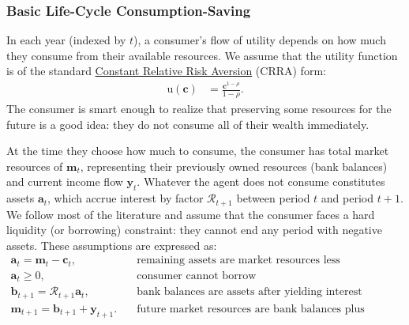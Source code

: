 \documentclass{article}
\newcommand{\CRRA}{\rho}
\newcommand{\uFunc}{\mathrm{u}}
\newcommand{\cLvl}{\mathbf{c}}
\newcommand{\mLvl}{\mathbf{m}}
\newcommand{\yLvl}{\mathbf{y}}
\newcommand{\aLvl}{\mathbf{a}}
\newcommand{\Rport}{\mathcal{R}}
\newcommand{\bLvl}{\mathbf{b}}
\begin{document}
\subsubsection{Basic Life-Cycle Consumption-Saving}\label{basic-cs}

In each year (indexed by $t$), a consumer's flow of utility depends on how much they consume from their available resources.
We assume that the utility function is of the standard \href{https://en.wikipedia.org/wiki/Isoelastic\_utility}{Constant Relative Risk Aversion} (CRRA) form:
\begin{align}
    \uFunc(\cLvl) & = \frac{\cLvl^{1-\CRRA}}{1-\CRRA}.
\end{align}
The consumer is smart enough to realize that preserving some resources for the future is a good idea: they do not consume all of their wealth immediately.

At the time they choose how much to consume, the consumer has total market resources of $\mLvl_t$, representing their previously owned resources (bank balances) and current income flow $\yLvl_t$.
Whatever the agent does not consume constitutes assets $\aLvl_t$, which accrue interest by factor $\Rport_{t+1}$ between period $t$ and period $t+1$.
We follow most of the literature and assume that the consumer faces a hard liquidity (or borrowing) constraint: they cannot end any period with negative assets.
These assumptions are expressed as:
\begin{align}
    \aLvl_t = \mLvl_t - \cLvl_t, & \text{~~~remaining assets are market resources less consumption} \\
    \aLvl_t \geq 0, & \text{~~~consumer cannot borrow} \\
    \bLvl_{t+1} = \Rport_{t+1} \aLvl_t, & \text{~~~bank balances are assets after yielding interest} \\
    \mLvl_{t+1} = \bLvl_{t+1} + \yLvl_{t+1}. & \text{~~~future market resources are bank balances plus income} \\
\end{align}
\end{document}
